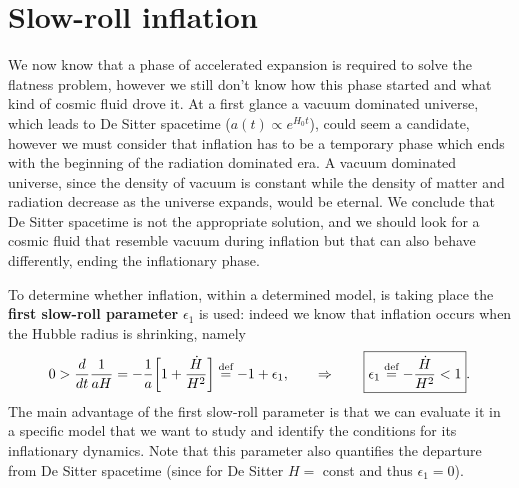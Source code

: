 \section{Slow-roll inflation}
We now know that a phase of accelerated expansion is required to solve the flatness problem, however we still don't know how this phase started and what kind of cosmic fluid drove it. At a first glance a vacuum dominated universe, which leads to De Sitter spacetime ($a(t)\propto e^{H_0t}$), could seem a candidate, however we must consider that inflation has to be a temporary phase which ends with the beginning of the radiation dominated era. A vacuum dominated universe, since the density of vacuum is constant while the density of matter and radiation decrease as the universe expands, would be eternal. We conclude that De Sitter spacetime is not the appropriate solution, and we should look for a cosmic fluid that resemble vacuum during inflation but that can also behave differently, ending the inflationary phase.

To determine whether inflation, within a determined model, is taking place the \textbf{first slow-roll parameter} $\epsilon_1$ is used: indeed we know that inflation occurs when the Hubble radius is shrinking, namely
\begin{equation}
    \label{eq:First_SR_paramteter}
    0>\frac{d}{dt}\frac{1}{aH}=-\frac{1}{a}\bigg[1+\frac{\dot H}{H^2}\bigg]\stackrel{\text{def}}{=}-1+\epsilon_1,\qquad\Rightarrow\qquad\boxed{\epsilon_1\stackrel{\text{def}}{=}-\frac{\dot H}{H^2}<1}.
\end{equation}
The main advantage of the first slow-roll parameter is that we can evaluate it in a specific model that we want to study and identify the conditions for its inflationary dynamics. Note that this parameter also quantifies the departure from De Sitter spacetime (since for De Sitter $H=$ const and thus $\epsilon_1=0$).

